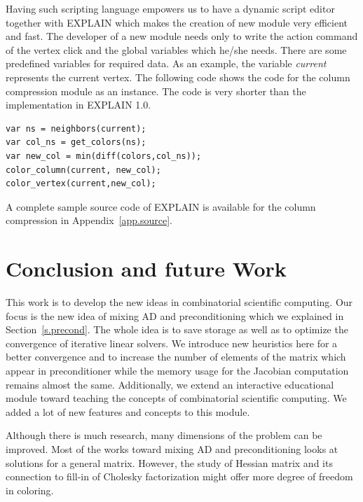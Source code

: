 \documentclass[12pt, twoside,a4paper,toc=bibliography]{scrbook}
\newcommand{\secref}[1]{Section~\protect\ref{#1}}
\newcommand{\appref}[1]{Appendix~\protect\ref{#1}}
\begin{document}
Having such scripting language empowers us to have a dynamic script editor
together with EXPLAIN which makes the creation of new module very efficient and fast.
The developer of a new module needs only to write the action command of the vertex
click and the global variables which he/she needs.
There are some predefined variables for required data.
As an example, the variable \textit{current} represents the current vertex.
The following code shows the code for the column compression
module as an instance. The code is very shorter than the implementation in EXPLAIN 1.0.
\begin{lstlisting}
var ns = neighbors(current);
var col_ns = get_colors(ns);
var new_col = min(diff(colors,col_ns));
color_column(current, new_col);
color_vertex(current,new_col);
\end{lstlisting}
A complete sample source code of EXPLAIN is available for the column compression
in \appref{app.source}.


\chapter{Conclusion and future Work}
\label{conc}
This work is to develop the new ideas in combinatorial scientific
computing. Our focus is the new idea of mixing AD and preconditioning which we explained in \secref{s.precond}. The whole idea is to save storage as well as to optimize the convergence of iterative linear solvers. We introduce new heuristics here for a better convergence and to increase the number of elements of the matrix which appear in preconditioner while the memory usage for the Jacobian computation
remains almost the same. Additionally, we extend an interactive educational module toward teaching the concepts of combinatorial scientific computing. We added a lot of new features and concepts to this module.

Although there is much research, many dimensions of the problem can be improved. Most of the works toward mixing AD and preconditioning looks at solutions for a general matrix. However, the study of Hessian matrix and its connection to fill-in of Cholesky factorization might offer more degree of freedom in coloring.
\end{document}
